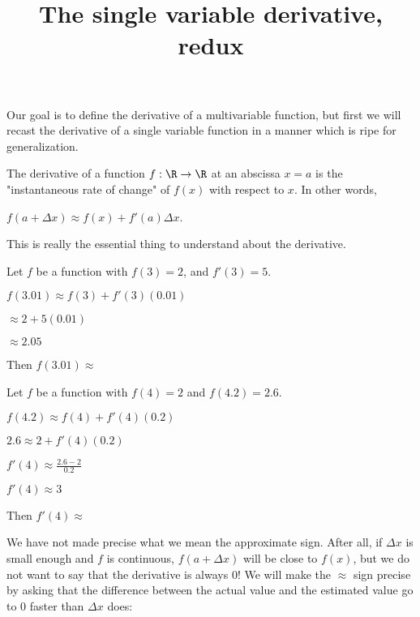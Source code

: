 \documentclass{ximera}
\title{The single variable derivative, redux}
\begin{document}
	Our goal is to define the derivative of a multivariable function, but first we will recast the derivative of a single variable function in a
	manner which is ripe for generalization.
	
	The derivative of a function $f:\R \to \R$ at an abscissa $x = a$ is the "instantaneous rate of change" of $f(x)$ with respect to $x$.
	In other words, 
	
	$f(a + \Delta x) \approx f(x) +f'(a)\Delta x$.
	
	This is really the essential thing to understand about the derivative.
	
	\begin{question}
		Let $f$ be a function with $f(3)  = 2$, and $f'(3) = 5$.
		\begin{solution}
			\begin{hint}
				$f(3.01) \approx f(3)+f'(3)(0.01)$
			\end{hint}
			\begin{hint}
				$\approx 2+5(0.01)$
			\end{hint}
			\begin{hint}
				$\approx 2.05$
			\end{hint}
			Then $f(3.01) \approx $ 
		\end{solution}
	\end{question}
	
	\begin{question}
		Let $f$ be a function with $f(4)=2$ and $f(4.2) = 2.6$.  
		
		\begin{solution}
			\begin{hint}
				$f(4.2) \approx f(4)+f'(4)(0.2)$
			\end{hint}
			\begin{hint}
				$2.6 \approx 2+f'(4)(0.2)$
			\end{hint}
			\begin{hint}
				$f'(4) \approx \frac{2.6 - 2}{0.2}$
			\end{hint}
			\begin{hint}
				$f'(4) \approx 3$
			\end{hint}
			Then $f'(4) \approx$ \answer{3}
		\end{solution}
	\end{question}
	
	We have not made precise what we mean the approximate sign.  After all, if $\Delta x$ is small enough and $f$ is continuous, 
	$f(a+\Delta x)$ will be close to $f(x)$, but we do not want to say that the derivative is always $0$!  We will make the  $\approx$ sign precise by asking that the difference 
	between the actual value and the estimated value go to $0$ faster than $\Delta x$ does:
	
\end{document}
